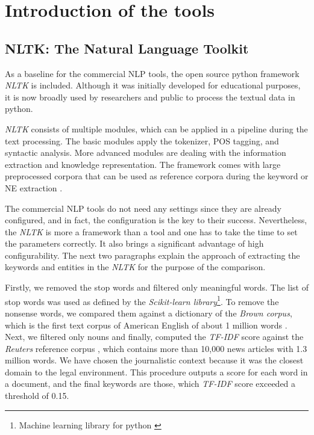 \documentclass[
  digital, %
  notable,   %
  nolof,     %
  nolot,     %
]{fithesis3}
\begin{document}
\section{Introduction of the tools}

\subsection{NLTK: The Natural Language Toolkit}
As a baseline for the commercial NLP tools,  the open source python framework \textit{NLTK} is included\cite{bird2004nltk}.
Although it was initially developed for educational purposes, it is now broadly used by researchers and public to process the textual data in python.

\textit{NLTK} consists of multiple modules, which can be applied in a pipeline during the text processing. 
The basic modules apply the tokenizer, POS tagging, and syntactic analysis.
More advanced modules are dealing with the information extraction and knowledge representation.
The framework comes with large preprocessed corpora that can be used as reference corpora during the keyword or NE extraction \cite{bird2009natural}.

The commercial NLP tools do not need any settings since they are already configured, and in fact, the configuration is the key to their success.
Nevertheless, the \textit{NLTK} is more a framework than a tool and one has to take the time to set the parameters correctly.
It also brings a significant advantage of high configurability.
The next two paragraphs explain the approach of extracting the keywords and entities in the \textit{NLTK} for the purpose of the comparison.

Firstly, we removed the stop words and filtered only meaningful words.
The list of stop words was used as defined by the \textit{Scikit-learn library}\footnote{Machine learning library for python \cite{pedregosa2011scikit}}.
To remove the nonsense words, we compared them against a dictionary of the \textit{Brown corpus}, which is the first text corpus of American English of about 1 million words \cite{brownCorpus}.
Next, we filtered only nouns and finally, computed the \textit{TF-IDF} score against the \textit{Reuters} reference corpus \cite[sec. 2.1]{bird2009natural}, which contains more than 10,000 news articles with 1.3 million words.
We have chosen the journalistic context because it was the closest domain to the legal environment.
This procedure outputs a score for each word in a document, and the final keywords are those, which \textit{TF-IDF} score exceeded a threshold of 0.15.
\end{document}
